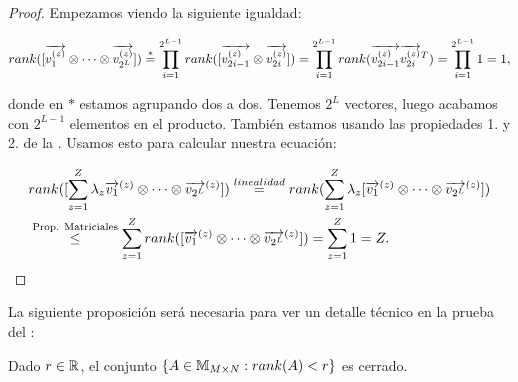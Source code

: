 \begin{proof}

    Empezamos viendo la siguiente igualdad:

    \begin{equation}
        \begin{split}
            rank([\nv{v_1^{(z)}} \otimes \cdots \otimes \nv{v_{2^L}^{(z)}}]) \encima{=}{*} \prod_{i = 1}^{2^{L-1}} rank([\nv{v_{2i - 1}^{(z)}} \otimes\nv{v_{2i}^{(z)}}]) = \prod_{i = 1}^{2^{L-1}} rank(\nv{v_{2i - 1}^{(z)}} \nv{v_{2i}^{(z)}}^T) = \prod_{i = 1}^{2^{L-1}} 1 = 1,
        \end{split}
    \end{equation}

    donde en $*$ estamos agrupando dos a dos. Tenemos $2^L$ vectores, luego acabamos con $2^{L-1}$ elementos en el producto. También estamos usando las propiedades 1. y 2. de la . Usamos esto para calcular nuestra ecuación:

    \begin{equation}
        \begin{split}
            &rank([\sum_{z = 1}^Z \lambda_z \nv{v_1}^{(z)} \otimes \cdots \otimes \nv{v_{2^L}}^{(z)}]) \encima{=}{linealidad} rank(\sum_{z = 1}^Z \lambda_z [\nv{v_1}^{(z)} \otimes \cdots \otimes \nv{v_{2^L}}^{(z)}]) \\
            &\encima{\leq}{\text{Prop. Matriciales}} \sum_{z = 1}^Z rank([\nv{v_1}^{(z)} \otimes \cdots \otimes \nv{v_{2^L}}^{(z)}]) = \sum_{z = 1}^Z 1 = Z.
        \end{split}
    \end{equation}
\end{proof}

La siguiente proposición será necesaria para ver un detalle técnico en la prueba del :

\begin{proposicion} \label{prop:conjunto_matrices_cerrado}
    Dado $r \in \R$, el conjunto $\conjunto{A \in \espaciomatrices{M}{N}: rank(A) < r }$ es cerrado.
\end{proposicion}

